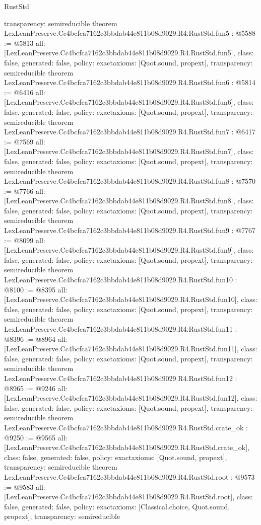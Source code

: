 \begin{lexlean}{RustStd}
\begin{coremodule}
{  transparency: semireducible
}
theorem LexLeanPreserve.Cc4bcfca7162c3bbdab44e811b08d9029.R4.RustStd.fun5 : @5588 := @5813 {
  all: [LexLeanPreserve.Cc4bcfca7162c3bbdab44e811b08d9029.R4.RustStd.fun5],
  class: false,
  generated: false,
  policy: exact{axioms: [Quot.sound, propext]},
  transparency: semireducible
}
theorem LexLeanPreserve.Cc4bcfca7162c3bbdab44e811b08d9029.R4.RustStd.fun6 : @5814 := @6416 {
  all: [LexLeanPreserve.Cc4bcfca7162c3bbdab44e811b08d9029.R4.RustStd.fun6],
  class: false,
  generated: false,
  policy: exact{axioms: [Quot.sound, propext]},
  transparency: semireducible
}
theorem LexLeanPreserve.Cc4bcfca7162c3bbdab44e811b08d9029.R4.RustStd.fun7 : @6417 := @7569 {
  all: [LexLeanPreserve.Cc4bcfca7162c3bbdab44e811b08d9029.R4.RustStd.fun7],
  class: false,
  generated: false,
  policy: exact{axioms: [Quot.sound, propext]},
  transparency: semireducible
}
theorem LexLeanPreserve.Cc4bcfca7162c3bbdab44e811b08d9029.R4.RustStd.fun8 : @7570 := @7766 {
  all: [LexLeanPreserve.Cc4bcfca7162c3bbdab44e811b08d9029.R4.RustStd.fun8],
  class: false,
  generated: false,
  policy: exact{axioms: [Quot.sound, propext]},
  transparency: semireducible
}
theorem LexLeanPreserve.Cc4bcfca7162c3bbdab44e811b08d9029.R4.RustStd.fun9 : @7767 := @8099 {
  all: [LexLeanPreserve.Cc4bcfca7162c3bbdab44e811b08d9029.R4.RustStd.fun9],
  class: false,
  generated: false,
  policy: exact{axioms: [Quot.sound, propext]},
  transparency: semireducible
}
theorem LexLeanPreserve.Cc4bcfca7162c3bbdab44e811b08d9029.R4.RustStd.fun10 : @8100 := @8395 {
  all: [LexLeanPreserve.Cc4bcfca7162c3bbdab44e811b08d9029.R4.RustStd.fun10],
  class: false,
  generated: false,
  policy: exact{axioms: [Quot.sound, propext]},
  transparency: semireducible
}
theorem LexLeanPreserve.Cc4bcfca7162c3bbdab44e811b08d9029.R4.RustStd.fun11 : @8396 := @8964 {
  all: [LexLeanPreserve.Cc4bcfca7162c3bbdab44e811b08d9029.R4.RustStd.fun11],
  class: false,
  generated: false,
  policy: exact{axioms: [Quot.sound, propext]},
  transparency: semireducible
}
theorem LexLeanPreserve.Cc4bcfca7162c3bbdab44e811b08d9029.R4.RustStd.fun12 : @8965 := @9246 {
  all: [LexLeanPreserve.Cc4bcfca7162c3bbdab44e811b08d9029.R4.RustStd.fun12],
  class: false,
  generated: false,
  policy: exact{axioms: [Quot.sound, propext]},
  transparency: semireducible
}
theorem LexLeanPreserve.Cc4bcfca7162c3bbdab44e811b08d9029.R4.RustStd.crate_ok : @9250 := @9565 {
  all: [LexLeanPreserve.Cc4bcfca7162c3bbdab44e811b08d9029.R4.RustStd.crate_ok],
  class: false,
  generated: false,
  policy: exact{axioms: [Quot.sound, propext]},
  transparency: semireducible
}
theorem LexLeanPreserve.Cc4bcfca7162c3bbdab44e811b08d9029.R4.RustStd.root : @9573 := @9583 {
  all: [LexLeanPreserve.Cc4bcfca7162c3bbdab44e811b08d9029.R4.RustStd.root],
  class: false,
  generated: false,
  policy: exact{axioms: [Classical.choice, Quot.sound, propext]},
  transparency: semireducible
}


\end{coremodule}
\end{lexlean}
